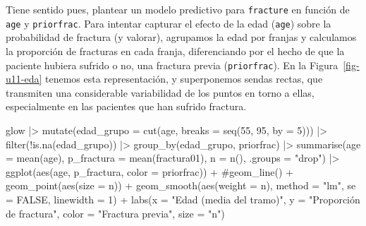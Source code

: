 \documentclass[
  letterpaper,
  DIV=11,
  numbers=noendperiod]{scrartcl}
\newenvironment{Shaded}{\begin{snugshade}}{\end{snugshade}}
\newcommand{\AttributeTok}[1]{\textcolor[rgb]{0.40,0.45,0.13}{#1}}
\newcommand{\CommentTok}[1]{\textcolor[rgb]{0.37,0.37,0.37}{#1}}
\newcommand{\ConstantTok}[1]{\textcolor[rgb]{0.56,0.35,0.01}{#1}}
\newcommand{\DecValTok}[1]{\textcolor[rgb]{0.68,0.00,0.00}{#1}}
\newcommand{\FunctionTok}[1]{\textcolor[rgb]{0.28,0.35,0.67}{#1}}
\newcommand{\NormalTok}[1]{\textcolor[rgb]{0.00,0.23,0.31}{#1}}
\newcommand{\SpecialCharTok}[1]{\textcolor[rgb]{0.37,0.37,0.37}{#1}}
\newcommand{\StringTok}[1]{\textcolor[rgb]{0.13,0.47,0.30}{#1}}
\begin{document}
Tiene sentido pues, plantear un modelo predictivo para \texttt{fracture}
en función de \texttt{age} y \texttt{priorfrac}. Para intentar capturar
el efecto de la edad (\texttt{age}) sobre la probabilidad de fractura (y
valorar), agrupamos la edad por franjas y calculamos la proporción de
fracturas en cada franja, diferenciando por el hecho de que la paciente
hubiera sufrido o no, una fractura previa (\texttt{priorfrac}). En la
Figura~\ref{fig-u11-eda} tenemos esta representación, y superponemos
sendas rectas, que transmiten una considerable variabilidad de los
puntos en torno a ellas, especialmente en las pacientes que han sufrido
fractura.

\begin{Shaded}
\begin{Highlighting}[]
\NormalTok{glow }\SpecialCharTok{|\textgreater{}}
  \FunctionTok{mutate}\NormalTok{(}\AttributeTok{edad\_grupo =} \FunctionTok{cut}\NormalTok{(age, }\AttributeTok{breaks =} \FunctionTok{seq}\NormalTok{(}\DecValTok{55}\NormalTok{, }\DecValTok{95}\NormalTok{, }\AttributeTok{by =} \DecValTok{5}\NormalTok{))) }\SpecialCharTok{|\textgreater{}}
  \FunctionTok{filter}\NormalTok{(}\SpecialCharTok{!}\FunctionTok{is.na}\NormalTok{(edad\_grupo)) }\SpecialCharTok{|\textgreater{}}
  \FunctionTok{group\_by}\NormalTok{(edad\_grupo, priorfrac) }\SpecialCharTok{|\textgreater{}}
  \FunctionTok{summarise}\NormalTok{(}\AttributeTok{age =} \FunctionTok{mean}\NormalTok{(age), }\AttributeTok{p\_fractura =} \FunctionTok{mean}\NormalTok{(fractura01), }\AttributeTok{n =} \FunctionTok{n}\NormalTok{(), }\AttributeTok{.groups =} \StringTok{"drop"}\NormalTok{) }\SpecialCharTok{|\textgreater{}}
  \FunctionTok{ggplot}\NormalTok{(}\FunctionTok{aes}\NormalTok{(age, p\_fractura, }\AttributeTok{color =}\NormalTok{ priorfrac)) }\SpecialCharTok{+}
  \CommentTok{\#geom\_line() + }
  \FunctionTok{geom\_point}\NormalTok{(}\FunctionTok{aes}\NormalTok{(}\AttributeTok{size =}\NormalTok{ n)) }\SpecialCharTok{+}
  \FunctionTok{geom\_smooth}\NormalTok{(}\FunctionTok{aes}\NormalTok{(}\AttributeTok{weight =}\NormalTok{ n), }\AttributeTok{method =} \StringTok{"lm"}\NormalTok{, }\AttributeTok{se =} \ConstantTok{FALSE}\NormalTok{, }\AttributeTok{linewidth =} \DecValTok{1}\NormalTok{) }\SpecialCharTok{+}
  \FunctionTok{labs}\NormalTok{(}\AttributeTok{x =} \StringTok{"Edad (media del tramo)"}\NormalTok{, }\AttributeTok{y =} \StringTok{"Proporción de fractura"}\NormalTok{,}
       \AttributeTok{color =} \StringTok{"Fractura previa"}\NormalTok{, }\AttributeTok{size =} \StringTok{"n"}\NormalTok{)}
\end{Highlighting}
\end{Shaded}
\end{document}
